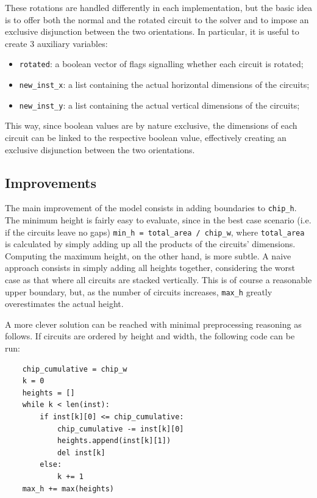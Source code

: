 \documentclass[a4paper, 12pt]{article}
\begin{document}
These rotations are handled differently in each implementation, but the basic idea is to offer both the normal and the rotated circuit to the solver and to impose an exclusive disjunction between the two orientations. In particular, it is useful to create 3 auxiliary variables:

\begin{itemize}
    \item \verb|rotated|: a boolean vector of flags signalling whether each circuit is rotated;
    \item \verb|new_inst_x|: a list containing the actual horizontal dimensions of the circuits;
    \item \verb|new_inst_y|: a list containing the actual vertical dimensions of the circuits;
\end{itemize}

This way, since boolean values are by nature exclusive, the dimensions of each circuit can be linked to the respective boolean value, effectively creating an exclusive disjunction between the two orientations.


\subsection{Improvements}\label{sec:improvements}

The main improvement of the model consists in adding boundaries to \verb|chip_h|. The minimum height is fairly easy to evaluate, since in the best case scenario (i.e. if the circuits leave no gaps) \verb|min_h = total_area / chip_w|, where \verb|total_area| is calculated by simply adding up all the products of the circuits' dimensions. Computing the maximum height, on the other hand, is more subtle. A naive approach consists in simply adding all heights together, considering the worst case as that where all circuits are stacked vertically. This is of course a reasonable upper boundary, but, as the number of circuits increases, \verb|max_h| greatly overestimates the actual height.

A more clever solution can be reached with minimal preprocessing reasoning as follows. If circuits are ordered by height and width, the following code can be run:
\begin{verbatim}
    chip_cumulative = chip_w
    k = 0
    heights = []
    while k < len(inst):
        if inst[k][0] <= chip_cumulative:
            chip_cumulative -= inst[k][0]
            heights.append(inst[k][1])
            del inst[k]
        else:
            k += 1
    max_h += max(heights)
\end{verbatim}
\end{document}
